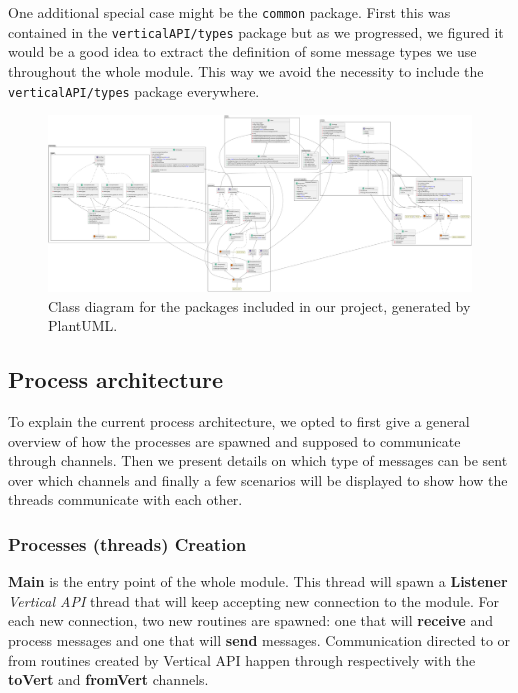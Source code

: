 \documentclass[a4paper,english,10pt,NET]{tumarticle}
\begin{document}
One additional special case might be the \texttt{common} package.
First this was contained in the \texttt{verticalAPI/types} package but as we progressed, we figured it would be a good idea to extract the definition of some message types we use throughout the whole module.
This way we avoid the necessity to include the \texttt{verticalAPI/types} package everywhere.

\begin{landscape}
	\pagestyle{empty}
	\begin{figure}
		\centering
		\hspace*{-0.1\linewidth}\includegraphics[width=1.2\linewidth]{figures/class}
		\caption{Class diagram for the packages included in our project, generated by PlantUML.}
		\label{fig:classDia}
	\end{figure}
\end{landscape}

\subsection{Process architecture}

To explain the current process architecture, we opted to first give a general overview of how the processes are spawned and supposed to communicate through channels. Then we present details on which type of messages can be sent over which channels and finally a few scenarios will be displayed to show how the threads communicate with each other.

\subsubsection{Processes (threads) Creation} \label{process-creation}

\textbf{Main} is the entry point of the whole module. This thread will spawn a \textbf{Listener} \textit{Vertical API} thread that will keep accepting new connection to the module. For each new connection, two new routines are spawned: one that will \textbf{receive} and process messages and one that will \textbf{send} messages. Communication directed to or from routines created by Vertical API happen through respectively with the \textbf{toVert} and \textbf{fromVert} channels.
\end{document}
